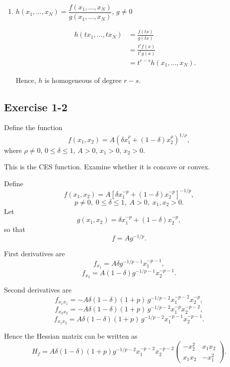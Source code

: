 \begin{enumerate}
    Hence, $h$ is homogeneous of degree $\boxed{r+s}$.

    \item[(v)] $h(x_1,\dots,x_N)=\dfrac{f(x_1,\dots,x_N)}{g(x_1,\dots,x_N)}$, $g\neq 0$

    \[
\begin{aligned}
    h(tx_1,\dots,tx_N)
    &= \frac{f(tx)}{g(tx)}\\
    &= \frac{t^r f(x)}{t^s g(x)}\\
    &= t^{r-s} h(x_1,\dots,x_N).
\end{aligned}
    \]

    Hence, $h$ is homogeneous of degree $\boxed{r-s}$.
\end{enumerate}




\vspace{30pt}
\begin{tcolorbox}[breakable]
\subsection*{Exercise 1-2}

Define the function
\[
f(x_1,x_2) = A\left(\delta x_1^{\rho} + (1-\delta)x_2^{\rho}\right)^{1/\rho},
\]
where $\rho \neq 0$, $0 \le \delta \le 1$, $A>0$, $x_1>0$, $x_2>0$.

This is the CES function. Examine whether it is concave or convex.

\end{tcolorbox}

Define
\[
f(x_1,x_2)=A\left[\delta x_1^{-p}+(1-\delta)x_2^{-p}\right]^{-1/p},
\]
\[
p\neq 0,\; 0\le \delta \le 1,\; A>0,\; x_1,x_2>0.
\]
Let
\[
g(x_1,x_2)=\delta x_1^{-p}+(1-\delta)x_2^{-p},
\]
so that
\[
f=A g^{-1/p}.
\]

First derivatives are
\[
f_{x_1}=A\delta g^{-1/p-1}x_1^{-p-1},
\]
\[
f_{x_2}=A(1-\delta)g^{-1/p-1}x_2^{-p-1}.
\]

Second derivatives are
\[
f_{x_1x_1}
=
-A\delta(1-\delta)(1+p)\,
g^{-1/p-2}x_1^{-p-2}x_2^{-p},
\]
\[
f_{x_2x_2}
=
-A\delta(1-\delta)(1+p)\,
g^{-1/p-2}x_1^{-p}x_2^{-p-2},
\]
\[
f_{x_1x_2}
=
A\delta(1-\delta)(1+p)\,
g^{-1/p-2}x_1^{-p-1}x_2^{-p-1}.
\]

Hence the Hessian matrix can be written as
\[
H_f
=
A\delta(1-\delta)(1+p)g^{-1/p-2}x_1^{-p-2}x_2^{-p-2}
\begin{pmatrix}
-x_2^2 & x_1x_2\\
x_1x_2 & -x_1^2
\end{pmatrix}.
\]

